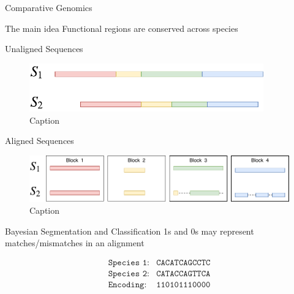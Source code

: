 \documentclass{beamer}
\begin{document}
    \begin{frame}{Comparative Genomics}
        \begin{block}{The main idea}
            Functional regions are conserved across species
        \end{block}
    \end{frame}
    
    \begin{frame}{Unaligned Sequences}
        \begin{figure}
            \centering
            \includegraphics[width=0.9\textwidth]{UnAligned.pdf}
            \caption{Caption}
            \label{fig:unaligned}
        \end{figure}
    \end{frame}
    
    \begin{frame}{Aligned Sequences}
        \begin{figure}
            \centering
            \includegraphics[width=\textwidth]{Aligned.pdf}
            \caption{Caption}
            \label{fig:aligned}
        \end{figure}
    \end{frame}
    \begin{frame}{Bayesian Segmentation and Classification}
        1s and 0s may represent matches/mismatches in an alignment
        
        \begin{align*}
            \texttt{Species 1:}&\texttt{CACATCAGCCTC}\\
            \texttt{Species 2:}&\texttt{CATACCAGTTCA}\\
            \texttt{Encoding:}&\texttt{110101110000}
        \end{align*}
        
    
    \end{frame}
    
\end{document}
